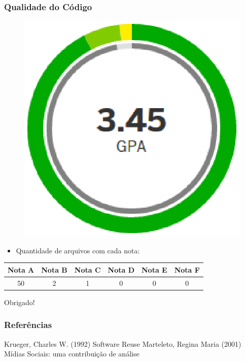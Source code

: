 \documentclass{beamer}
\begin{document}
\begin{frame}
\frametitle{Qualidade do Código}

\begin{figure}[!h]
	\centering
	\includegraphics[scale=0.5]{figuras/gpa.eps}
\end{figure}

\begin{itemize}
	\item{Quantidade de arquivos com cada nota:}
\end{itemize}

\begin{table}[!h]
\centering
\begin{tabular}{cccccc}
\toprule
\textbf{Nota A} & \textbf{Nota B} & \textbf{Nota C} & \textbf{Nota D} & \textbf{Nota E} & \textbf{Nota F} \\ \midrule
50 & 2 & 1 & 0 & 0 & 0							   \\ \bottomrule
\end{tabular}
\end{table}

\end{frame}

\begin{frame}
\Huge{\centerline{Obrigado!}}
\end{frame}

\begin{frame}
\frametitle{Referências}
\footnotesize{
\begin{thebibliography}{99} %
 Krueger, Charles W. (1992)
\newblock Software Reuse
 Marteleto, Regina Maria (2001)
\newblock Mídias Sociais: uma contribuição de análise
\end{thebibliography}
}
\end{frame}
\end{document}
